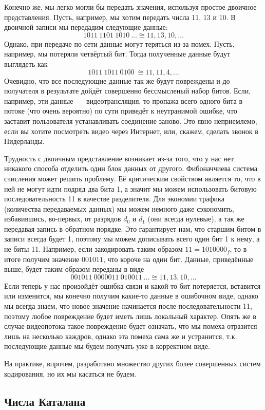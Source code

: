 Конечно же, мы легко могли бы передать значения, используя простое двоичное представления. Пусть, например, мы хотим передать числа 11, 13 и 10. В двоичной записи мы передадим следующие данные:
$$1011\ 1101\ 1010\ \ldots \cong 11,13,10,\ldots$$
Однако, при передаче по сети данные могут теряться из-за помех. Пусть, например, мы потеряли четвёртый бит. Тогда полученные данные будут выглядеть как
$$1011\ 1011\ 0100\ \cong 11, 11, 4, \ldots$$
Очевидно, что все последующие данные так же будут повреждены и до получателя в результате дойдёт совершенно бессмысленый набор битов. Если, например, эти данные~--- видеотрансляция, то пропажа всего одного бита в потоке (что очень вероятно) по сути приведёт к неутранимой ошибке, что заставит пользователя устанавливать соединение заново. Это явно неприемлемо, если вы хотите посмотреть видео через Интернет, или, скажем, сделать звонок в Нидерланды.

Трудность с двоичным представление возникает из-за того, что у нас нет никакого способа отделить один блок данных от другого. Фибоначчиева система счисления может решить проблему. Её критическим свойством является то, что в ней не могут идти подряд два бита 1, а значит мы можем использовать битовую последовательность 11 в качестве разделителя. Для экономии трафика (количества передаваемых данных) мы можем немного даже сэкономить, избавившись, во-первых, от разрядов $d_0$ и $d_1$ (они всегда нулевые), а так же передавая запись в обратном порядке. Это гарантирует нам, что старшим битом в записи всегда будет 1, поэтому мы можем дописывать всего один бит 1 к нему, а не биты 11. Например, если закодировать таким образом $11=1010000_f$, то в итоге получим значение $001011$, что короче на один бит. Данные, приведённые выше, будет таким образом переданы в виде
$$001011\ 0000011\ 010011\ \ldots \cong 11, 13, 10, \ldots$$
Если теперь у нас произойдёт ошибка связи и какой-то бит потеряется, вставится или изменится, мы конечно получим какие-то данные в ошибочном виде, однако мы всегда знаем, что новое значение начинается после последовательности 11, поэтому любое повреждение будет иметь лишь локальный характер. Опять же в случае видеопотока такое повреждение будет означать, что мы помеха отразится лишь на несколько каждров, однако эта помеха сама же и устранится, т.к. последующие данные мы будем получать уже в корректном виде.

На практике, впрочем, разработано множество других более совершенных систем кодирования, но их мы касаться не будем.

\subsection{Числа Каталана}

